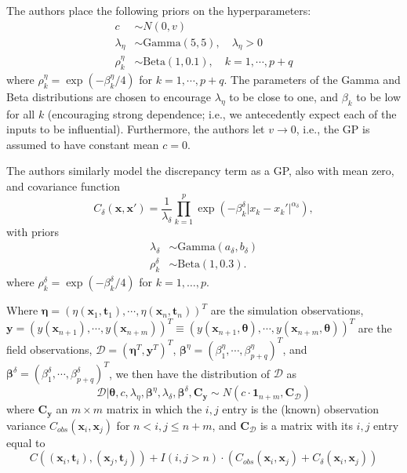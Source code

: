 \documentclass{article}
\begin{document}
The authors place the following priors on the hyperparameters:
\begin{equation}
\begin{aligned}
c&\sim N(0,v)\\
\lambda_\eta&\sim \mathrm{Gamma}(5,5),\quad\lambda_\eta>0\\
\rho_k^\eta &\sim \mathrm{Beta}(1,0.1),\quad k=1,\cdots,p+q
\end{aligned}
\end{equation}
where $\rho_k^\eta=\exp(-\beta_k^\eta/4)$ for $k=1,\cdots,p+q$. The parameters of the Gamma and Beta distributions are chosen to encourage $\lambda_\eta$ to be close to one, and $\beta_k$ to be low for all $k$ (encouraging strong dependence; i.e., we antecedently expect each of the inputs to be influential). Furthermore, the authors let $v\to0$, i.e., the GP is assumed to have constant mean $c=0$.

The authors similarly model the discrepancy term as a GP, also with mean zero, and covariance function
\begin{equation}
C_\delta(\mathbf x,\mathbf x') = \frac 1{\lambda_\delta} \prod_{k=1}^p
\exp\left( -\beta_k^\delta |x_k-x_k'|^{\alpha_\delta} \right),
\end{equation}
with priors
\begin{equation}
\begin{aligned}
\lambda_\delta &\sim \mathrm{Gamma}(a_\delta,b_\delta)\\
\rho^\delta_k &\sim \mathrm{Beta}(1,0.3).
\end{aligned}
\end{equation}
where $\rho_k^\delta=\exp(-\beta_k^\delta/4)$ for $k=1,\ldots,p$.

Where $\boldsymbol \eta = (\eta(\mathbf x_1,\mathbf t_1),\cdots,\eta(\mathbf x_n,\mathbf t_n))^T$ are the simulation observations, $\mathbf y = (y(\mathbf x_{n+1}),\cdots,y(\mathbf x_{n+m}))^T\equiv (y(\mathbf x_{n+1},\boldsymbol\theta),\cdots,y(\mathbf x_{n+m},\boldsymbol\theta))^T$ are the field observations, $\mathcal D = (\boldsymbol \eta^T,\mathbf y^T)^T$, $\boldsymbol \beta^\eta = (\beta^\eta_1,\cdots,\beta_{p+q}^\eta)^T$, and $\boldsymbol \beta^\delta = (\beta^\delta_1,\cdots,\beta_{p+q}^\delta)^T$, we then have the distribution of $\mathcal D$ as 
\begin{equation}
\mathcal D | \boldsymbol \theta,c,\lambda_\eta, \boldsymbol \beta^\eta,\lambda_\delta,\boldsymbol \beta^\delta,\mathbf C_{\mathbf y} \sim N(c \cdot \mathbf 1_{n+m}, \mathbf C_{\mathcal D})
\end{equation}
where $\mathbf C_{\mathbf y}$ an $m\times m$ matrix in which the $i,j$ entry is the (known) observation variance $C_{obs}(\mathbf x_i,\mathbf x_j)$ for $n<i,j\leq n+m$, and $\mathbf C_{\mathcal D}$ is a matrix with its $i,j$ entry equal to
\begin{equation}
C((\mathbf x_i,\mathbf t_i),(\mathbf x_j,\mathbf t_j)) + I(i,j>n)\cdot(C_{obs}(\mathbf x_i,\mathbf x_j) + C_\delta(\mathbf x_i,\mathbf x_j))
\end{equation}
\end{document}
